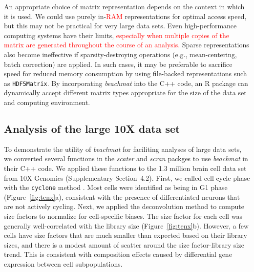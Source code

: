 \documentclass[10pt,letterpaper]{article}
\newcommand{\suppsecrealtenx}{4.2}
\newcommand{\beachmat}{\textit{beachmat}}
\newcommand{\code}[1]{\texttt{#1}}
\newcommand{\revised}[1]{\textcolor{red}{#1}}
\begin{document}
An appropriate choice of matrix representation depends on the context in which it is used.
We could use purely in-\revised{RAM} representations for optimal access speed, but this may not be practical for very large data sets.
Even high-performance computing systems have their limits, \revised{especially when multiple copies of the matrix are generated throughout the course of an analysis.}
Sparse representations also become ineffective if sparsity-destroying operations (e.g., mean-centering, batch correction) are applied.
In such cases, it may be preferable to sacrifice speed for reduced memory consumption by using file-backed representations such as \code{HDF5Matrix}.
By incorporating \beachmat{} into the C++ code, an R package can dynamically accept different matrix types appropriate for the size of the data set and computing environment.

\subsection*{Analysis of the large 10X data set}
To demonstrate the utility of \beachmat{} for faciliting analyses of large data sets, we converted several functions in the \textit{scater} \cite{mccarthy2017scater} and \textit{scran} packges \cite{lun2016stepbystep} to use \beachmat{} in their C++ code.
We applied these functions to the 1.3 million brain cell data set from 10X Genomics (Supplementary Section~\suppsecrealtenx{}).
First, we called cell cycle phase with the \code{cyclone} method \cite{scialdone2015computational}. 
Most cells were identified as being in G1 phase (Figure~\ref{fig:tenx}a), consistent with the presence of differentiated neurons that are not actively cycling.
Next, we applied the deconvolution method \cite{lun2016pooling} to compute size factors to normalize for cell-specific biases.
The size factor for each cell was generally well-correlated with the library size (Figure~\ref{fig:tenx}b).
However, a few cells have size factors that are much smaller than expected based on their library sizes, and there is a modest amount of scatter around the size factor-library size trend.
This is consistent with composition effects \cite{robinson2010scaling} caused by differential gene expression between cell subpopulations.
\end{document}

